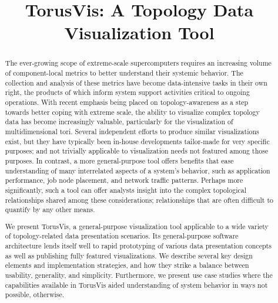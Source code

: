 \documentclass[
    10pt,
    conference,
    compsocconf
]{IEEEtran}
\begin{document}
\title{TorusVis: A Topology Data Visualization Tool}
\author{
}


\maketitle


\begin{abstract}
    The ever-growing scope of extreme-scale supercomputers requires an
    increasing volume of component-local metrics to better understand their
    systemic behavior.  The collection and analysis of these metrics have
    become data-intensive tasks in their own right, the products of which inform
    system support activities critical to ongoing operations.  With recent
    emphasis being placed on topology-awareness as a step towards better coping
    with extreme scale, the ability to visualize complex topology data has
    become increasingly valuable, particularly for the visualization of
    multidimensional tori.  Several independent efforts to produce similar
    visualizations exist, but they have typically been in-house developments
    tailor-made for very specific purposes; and not trivially applicable to
    visualization needs not featured among those purposes.  In contrast, a more
    general-purpose tool offers benefits that ease understanding of many
    interrelated aspects of a system's behavior, such as application
    performance, job node placement, and network traffic patterns.  Perhaps more
    significantly, such a tool can offer analysts insight into the complex
    topological relationships shared among these considerations; relationships
    that are often difficult to quantify by any other means.

    We present TorusVis, a general-purpose visualization tool applicable to a
    wide variety of topology-related data presentation scenarios.  Its
    general-purpose software architecture lends itself well to rapid prototyping
    of various data presentation concepts as well as publishing fully featured
    visualizations.  We describe several key design elements and implementation
    strategies, and how they strike a balance between usability, generality, and
    simplicity.  Furthermore, we present use case studies where the capabilities
    available in TorusVis aided understanding of system behavior in ways not
    possible, otherwise.
\end{abstract}
\end{document}
